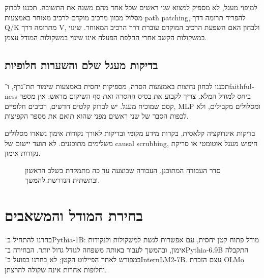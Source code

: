 \documentclass[11pt,a4paper]{article}
\newcommand{\en}[1]{\textenglish{#1}}
\begin{document}
למיפוי מעגל, לא מספיק למצוא שני ראשים שכל אחד מהם משנה את התשובה. תכננו לבדוק מסלול מכוון מרכיב מוקדם לרכיב מאוחר באמצעות \en{path patching}, להפריד תרומה דרך \en{Q/K} מתרומה דרך \en{V}, ולבחון האם השפעת הרכיב המוקדם עוברת דרך הרכיב המאוחר. שינוי במשקולות הקשב אחרי החלפת הפעלה אינו שינוי במשקולות המודל עצמן.

\subsection{בדיקות מעגל שלם והשערות חלופיות}
תכננו לבחון נחיצות באמצעות הסרה, מספיקות יחסית באמצעות שימור תת־גרף, ו־\en{faithfulness} ביחס למודל המלא. צריך לקבוע את בסיס ההסרה ואת סף השיקום מראש; אין מספר קסם שמוכיח מעגל. יש לבדוק קלטים חדשים, רכיבים חלופיים, \en{MLP} ומסלולים מקבילים, ולא לכפות הסבר של שני ראשים מפני שהוא תואם את מספר הקפיצות.

בדיקות אינדוקציה קלאסית, בקרות מידע מקומי ובדיקות לאורך נקודות אימון נשארו מסלולים משלימים מתוכננים. לא תועד יישום של \en{causal scrubbing}, חיפוש מעגל אוטומטי או סריקת נקודות אימון.

\begin{figure}[ht]
\centering
\begin{english}
\end{english}
\caption{סדר העבודה המתוכנן. העבודה שבוצעה עד כה מתמקדת בשלב הראשון ובתשתית הנדרשת להמשך.}
\end{figure}

\section{בחירת המודל והמשאבים}
בחרנו להתחיל ב־\en{Pythia-1B}: מודל פתוח קטן יחסית, עם אפשרות לגשת למשקולות ולנקודות אימון, ובהמשך לעבור באותה משפחה לגודל גדול יותר. הבחירה ב־\en{Pythia-6.9B} התקבלה במפורש לאחר הפיילוט הקטן; לא בחרנו בפועל ב־\en{InternLM2-7B}. עצם הזכרת \en{OLMo} וחלופות אחרות אינה שקולה להרצתן.
\end{document}
